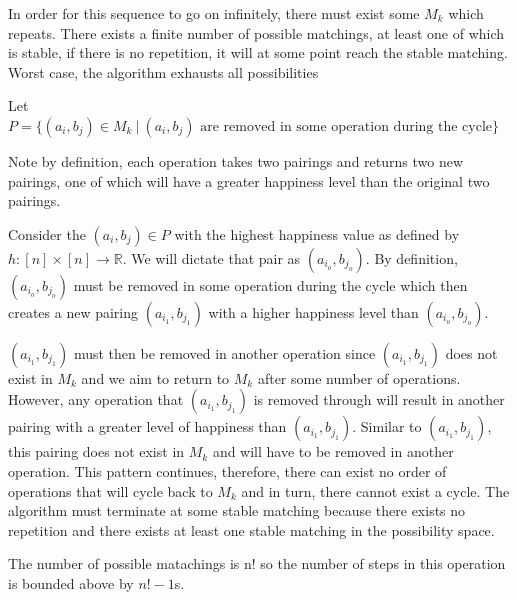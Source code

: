 \documentclass[12pt]{article}
\begin{document}
\begin{itemize}
    In order for this sequence to go on infinitely, there must exist some $M_k$ which repeats. There exists a finite number of possible matchings, at least one of which is stable, if there is no repetition, it will at some point reach the stable matching. Worst case, the algorithm exhausts all possibilities
    
    Let $P = \{(a_i, b_j) \in M_k ~|~ (a_i, b_j) \text{ are removed in some operation during the cycle}\}$ 
    
    Note by definition, each operation takes two pairings and returns two new pairings, one of which will have a greater happiness level than the original two pairings.

    Consider the $(a_i, b_j) \in P$ with the highest happiness value as defined by $h: [n] \times [n] \rightarrow \mathbb{R}$. We will dictate that pair as $(a_{i_o}, b_{j_o})$. By definition, $(a_{i_o}, b_{j_o})$ must be removed in some operation during the cycle which then creates a new pairing $(a_{i_1}, b_{j_1})$ with a higher happiness level than $(a_{i_o}, b_{j_o})$.  

    $(a_{i_1}, b_{j_1})$ must then be removed in another operation since $(a_{i_1}, b_{j_1})$ does not exist in $M_k$ and we aim to return to $M_k$ after some number of operations. However, any operation that $(a_{i_1}, b_{j_1})$ is removed through will result in another pairing with a greater level of happiness than $(a_{i_1}, b_{j_1})$. Similar to $(a_{i_1}, b_{j_1})$, this pairing does not exist in $M_k$ and will have to be removed in another operation. This pattern continues, therefore, there can exist no order of operations that will cycle back to $M_k$ and in turn, there cannot exist a cycle. The algorithm must terminate at some stable matching because there exists no repetition and there exists at least one stable matching in the possibility space.

    The number of possible matachings is n! so the number of steps in this operation is bounded above by $n! - 1$s. 

\end{itemize}
\end{document}
